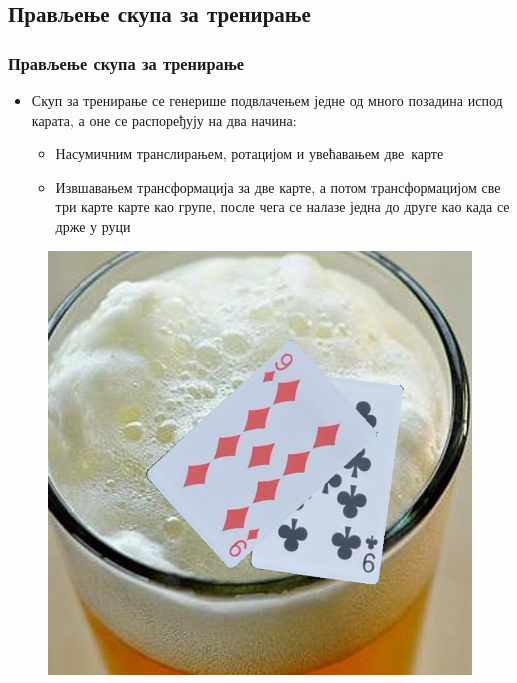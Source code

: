 \subsection{Прављење скупа за тренирање}
\begin{frame}
\frametitle{Прављење скупа за тренирање}
\begin{itemize}
 \item Скуп за тренирање се генерише подвлачењем једне од много позадина испод карата,
а оне се распоређују на два начина:
 \begin{itemize}
  \item Насумичним транслирањем, ротацијом и увећавањем
  \mbox{\alert{две карте}}
  \item  Извшавањем трансформација за две карте, а
  потом трансформацијом све \alert{три карте} карте као групе,
  после чега се налазе једна до друге као када се држе у руци
 \end{itemize}
\end{itemize}
\begin{figure}[H]
  \centering
      \includegraphics[scale=0.18]{slike/dveKarte.jpg} \hspace{1.2cm}

\end{figure}
\end{frame}
